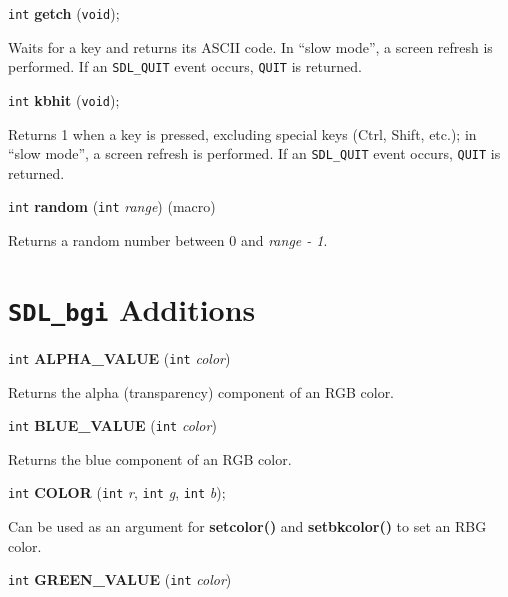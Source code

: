 \documentclass[a4paper,11pt]{article}
\newcommand{\SDLbgi}{\texttt{SDL\_bgi}}
\newcommand{\V}{\texttt{void}}      %
\newcommand{\I}{\texttt{int}}       %
\newcommand{\func}[1]{\textbf{#1}}  %
\newcommand{\A}[1]{\emph{#1}}       %
\newcommand{\T}[1]{\texttt{#1}}     %
\newenvironment{bgi}
{ %
  \begin{snugshade}
}
{ %
  \end{snugshade}
}
\begin{document}

\begin{bgi}
\I{} \func{getch} (\V{});
\end{bgi}

Waits for a key and returns its ASCII code. In ``slow mode'', a screen
refresh is performed. If an \T{SDL\_QUIT} event occurs, \T{QUIT} is
returned.


\begin{bgi}
\I{} \func{kbhit} (\V{});
\end{bgi}

Returns 1 when a key is pressed, excluding special keys (Ctrl, Shift,
etc.); in ``slow mode'', a screen refresh is performed. If an
\T{SDL\_QUIT} event occurs, \T{QUIT} is returned.


\begin{bgi}
\I{} \func{random} (\I{} \A{range}) (macro)
\end{bgi}

Returns a random number between 0 and \A{range - 1}.


\section{\SDLbgi{} Additions}

\begin{bgi}
\I{} \func{ALPHA\_VALUE} (\I{} \A{color})
\end{bgi}

Returns the alpha (transparency) component of an RGB color.



\begin{bgi}
\I{} \func{BLUE\_VALUE} (\I{} \A{color})
\end{bgi}

Returns the blue component of an RGB color.


\begin{bgi}
\I{} \func{COLOR} (\I{} \A{r}, \I{} \A{g}, \I{} \A{b});
\end{bgi}

Can be used as an argument for \func{setcolor()} and
\func{setbkcolor()} to set an RBG color.


\begin{bgi}
\I{} \func{GREEN\_VALUE} (\I{} \A{color})
\end{bgi}
\end{document}
